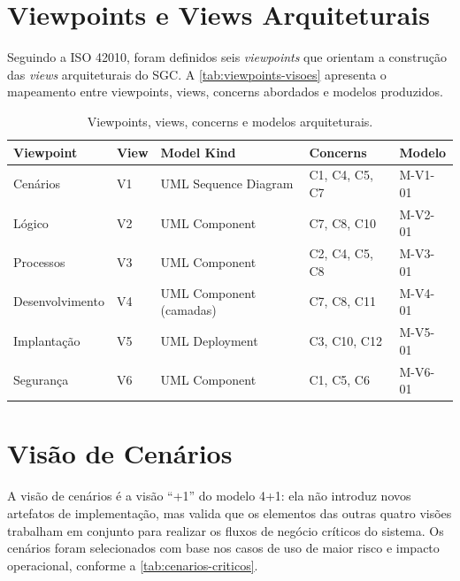 \section{Viewpoints e Views Arquiteturais}

Seguindo a ISO 42010, foram definidos seis \textit{viewpoints} que orientam a construção das \textit{views} arquiteturais do SGC. A \autoref{tab:viewpoints-visoes} apresenta o mapeamento entre viewpoints, views, concerns abordados e modelos produzidos.

\begin{table}[htbp]
\caption{Viewpoints, views, concerns e modelos arquiteturais.}
\label{tab:viewpoints-visoes}
\centering
\small
\begin{tabularx}{\textwidth}{|l|l|l|X|l|}
\hline
\textbf{Viewpoint} & \textbf{View} & \textbf{Model Kind} & \textbf{Concerns} & \textbf{Modelo} \\
\hline
Cenários         & V1 & UML Sequence Diagram     & C1, C4, C5, C7  & M-V1-01 \\
Lógico           & V2 & UML Component     & C7, C8, C10     & M-V2-01 \\
Processos        & V3 & UML Component     & C2, C4, C5, C8  & M-V3-01 \\
Desenvolvimento  & V4 & UML Component (camadas) & C7, C8, C11 & M-V4-01 \\
Implantação      & V5 & UML Deployment    & C3, C10, C12    & M-V5-01 \\
Segurança        & V6 & UML Component     & C1, C5, C6      & M-V6-01 \\
\hline
\end{tabularx}
\end{table}

\section{Visão de Cenários}
 
A visão de cenários é a visão ``+1'' do modelo 4+1: ela não introduz novos artefatos de
implementação, mas valida que os elementos das outras quatro visões trabalham em conjunto
para realizar os fluxos de negócio críticos do sistema. Os cenários foram selecionados com
base nos casos de uso de maior risco e impacto operacional, conforme a
\autoref{tab:cenarios-criticos}.
 
